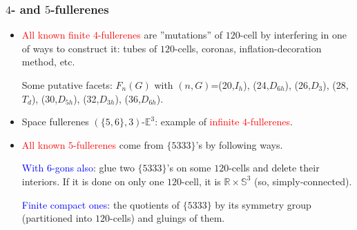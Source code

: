 \documentclass{beamer}
\begin{document}
\begin{frame}\frametitle{ $4$- and $5$-fullerenes}
\vspace{-2mm} 

\begin{itemize}
\item \textcolor{red}{All known finite $4$-fullerenes} are ''mutations'' of  
$120$-cell 
by interfering in 
one of ways to 
construct it: tubes of $120$-cells, coronas, inflation-decoration method, etc.

Some putative facets: $F_n(G)$ with $(n,G)$=(20,$I_h$), 
(24,$D_{6h}$), (26,$D_3$), (28,$T_d$), (30,$D_{5h}$), (32,$D_{3h}$), (36,$D_{6h}$).
\item Space fullerenes $(\{5,6\},3)$-$\mathbb{E}^3$: example of
\textcolor{red}{infinite $4$-fullerenes}.
\pause

\item 
\textcolor{red}{All known $5$-fullerenes} come from $\{5333\}$'s by following  
ways.

\textcolor{blue}{With $6$-gons also}: glue two $\{5333\}$'s on some
$120$-cells and delete their interiors. If it is done on
only one $120$-cell, it is $ \mathbb{R} \times \mathbb{S}^3$
(so, simply-connected).

\textcolor{blue}{Finite compact ones}: the  quotients of $\{5333\}$ by its
symmetry
group  
 (partitioned into  $120$-cells) and gluings of them.


\end{itemize}
\end{frame}


\end{document}
